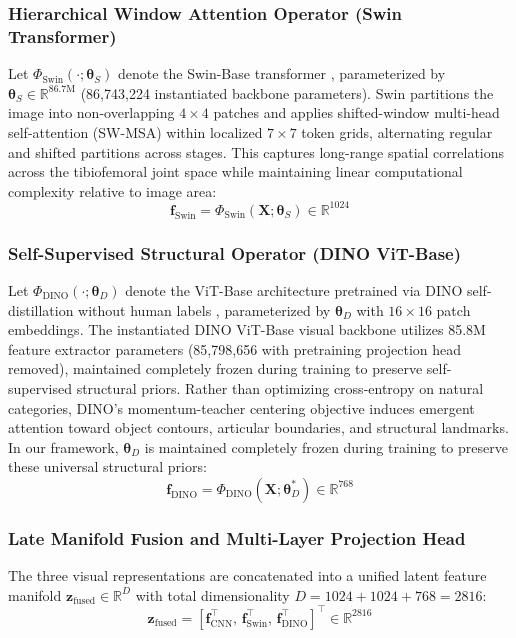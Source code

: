 \documentclass[10pt,journal]{IEEEtran}
\begin{document}
\subsubsection{Hierarchical Window Attention Operator (Swin Transformer)}
Let $\Phi_{\text{Swin}}(\cdot; \bm{\theta}_S)$ denote the Swin-Base transformer \cite{liu2021swin}, parameterized by $\bm{\theta}_S \in \mathbb{R}^{86.7\text{M}}$ (86,743,224 instantiated backbone parameters). Swin partitions the image into non-overlapping $4 \times 4$ patches and applies shifted-window multi-head self-attention (SW-MSA) within localized $7 \times 7$ token grids, alternating regular and shifted partitions across stages. This captures long-range spatial correlations across the tibiofemoral joint space while maintaining linear computational complexity relative to image area:
\begin{equation}
\mathbf{f}_{\text{Swin}} = \Phi_{\text{Swin}}(\mathbf{X}; \bm{\theta}_S) \in \mathbb{R}^{1024}
\label{eq:f_swin}
\end{equation}

\subsubsection{Self-Supervised Structural Operator (DINO ViT-Base)}
Let $\Phi_{\text{DINO}}(\cdot; \bm{\theta}_D)$ denote the ViT-Base architecture pretrained via DINO self-distillation without human labels \cite{caron2021dino}, parameterized by $\bm{\theta}_D$ with $16 \times 16$ patch embeddings. The instantiated DINO ViT-Base visual backbone utilizes 85.8M feature extractor parameters (85,798,656 with pretraining projection head removed), maintained completely frozen during training to preserve self-supervised structural priors. Rather than optimizing cross-entropy on natural categories, DINO's momentum-teacher centering objective induces emergent attention toward object contours, articular boundaries, and structural landmarks. In our framework, $\bm{\theta}_D$ is maintained completely frozen during training to preserve these universal structural priors:
\begin{equation}
\mathbf{f}_{\text{DINO}} = \Phi_{\text{DINO}}(\mathbf{X}; \bm{\theta}_D^*) \in \mathbb{R}^{768}
\label{eq:f_dino}
\end{equation}

\subsubsection{Late Manifold Fusion and Multi-Layer Projection Head}
The three visual representations are concatenated into a unified latent feature manifold $\mathbf{z}_{\text{fused}} \in \mathbb{R}^{D}$ with total dimensionality $D = 1024 + 1024 + 768 = 2816$:
\begin{equation}
\mathbf{z}_{\text{fused}} = \left[ \mathbf{f}_{\text{CNN}}^\top, \, \mathbf{f}_{\text{Swin}}^\top, \, \mathbf{f}_{\text{DINO}}^\top \right]^\top \in \mathbb{R}^{2816}
\label{eq:concat}
\end{equation}
\end{document}
